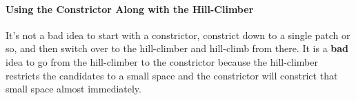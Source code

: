 \documentclass{article}
\begin{document}

\paragraph{Using the Constrictor Along with the Hill-Climber} It's not a bad idea to start with a constrictor, constrict down to a single patch or so, and then switch over to the hill-climber and hill-climb from there.  It is a {\bf bad} idea to go from the hill-climber to the constrictor because the hill-climber restricts the candidates to a small space and the constrictor will constrict that small space almost immediately.
\end{document}
